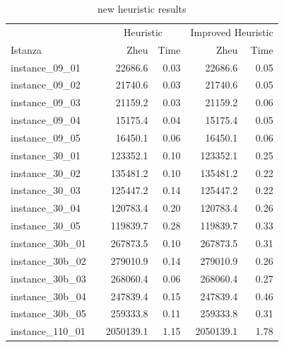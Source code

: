 \documentclass[12pt,a4paper,openright,twoside]{book}
\begin{document}
\begin{table}[h]
\centering
\caption{new heuristic results}
\label{Tab.6}
\small
\begin{tabular}{|ll|rr|rr|} 
\hline

\multicolumn{2}{|c|}{   } &     
\multicolumn{2}{c|}{Heuristic} &    
\multicolumn{2}{c|}{Improved Heuristic}  \\  
Istanza        &     &                   Zheu &      Time &       Zheu &      Time   \\   
\hline
instance\_09\_01            &     &    22686.6  &      0.03  &      22686.6  &     0.05  \\ 
instance\_09\_02            &     &    21740.6  &      0.03  &      21740.6  &     0.05  \\ 
instance\_09\_03            &     &    21159.2  &      0.03  &      21159.2  &     0.06  \\ 
instance\_09\_04            &     &    15175.4  &      0.04  &      15175.4  &     0.05  \\ 
instance\_09\_05            &     &    16450.1  &      0.06  &      16450.1  &     0.06  \\ 
instance\_30\_01            &     &   123352.1  &      0.10  &     123352.1  &     0.25  \\ 
instance\_30\_02            &     &   135481.2  &      0.10  &     135481.2  &     0.22  \\ 
instance\_30\_03            &     &   125447.2  &      0.14  &     125447.2  &     0.22  \\ 
instance\_30\_04            &     &   120783.4  &      0.20  &     120783.4  &     0.26  \\ 
instance\_30\_05            &     &   119839.7  &      0.28  &     119839.7  &     0.33  \\ 
instance\_30b\_01            &     &   267873.5  &      0.10  &     267873.5  &     0.31  \\ 
instance\_30b\_02            &     &   279010.9  &      0.14  &     279010.9  &     0.26  \\ 
instance\_30b\_03            &     &   268060.4  &      0.06  &     268060.4  &     0.27  \\ 
instance\_30b\_04            &     &   247839.4  &      0.15  &     247839.4  &     0.46  \\ 
instance\_30b\_05            &     &   259333.8  &      0.11  &     259333.8  &     0.31  \\ 
instance\_110\_01            &     &  2050139.1  &      1.15  &    2050139.1  &     1.78  \\ 

\end{tabular}
\end{table}
\end{document}
